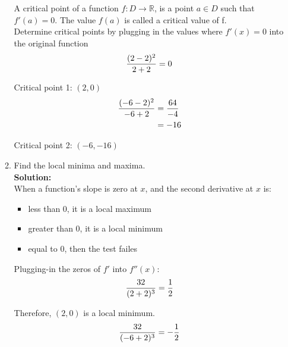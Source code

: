 \documentclass[a4paper]{article}
\begin{document}
\begin{enumerate}
\begin{enumerate}
	
A critical point of a function $f: D \rightarrow \mathbb{R}$, is a point $a \in D$ such that $f'(a) = 0$. The value $f(a)$ is called a critical value of f.\\


Determine critical points by plugging in the values where $f'(x) = 0$ into the original function\\



\begin{align*}
	\frac{(2 - 2)^2}{2+2} = 0\notag\\
\end{align*}
	
Critical point 1: $(2,0)$\\

\begin{align*}
	\frac{(-6 - 2)^2}{-6+2} &= \frac{64}{-4}\notag\\
	&= -16\notag
\end{align*}

Critical point 2: $(-6,-16)$\\		
	
	
	
	
	\item Find the local minima and maxima.\\
	\textbf{Solution:}\\

When a function's slope is zero at $x$, and the second derivative at $x$ is:

\begin{itemize}
	\item less than 0, it is a local maximum
	\item greater than 0, it is a local minimum
	\item equal to 0, then the test failes
\end{itemize}

Plugging-in the zeros of $f'$ into $f''(x)$:\\

\begin{align*}
	\frac{32}{(2+2)^3} = \frac{1}{2}\notag\\
\end{align*}

Therefore, $(2,0)$ is a local minimum.\\

\begin{align*}
	\frac{32}{(-6+2)^3} = -\frac{1}{2}\notag\\
\end{align*}


\end{enumerate}
\end{enumerate}
\end{document}
